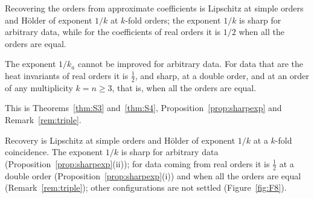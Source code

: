 %

Recovering the orders from approximate coefficients is Lipschitz at simple orders and H\"older of
exponent $1/k$ at $k$-fold orders; the exponent $1/k$ is sharp for arbitrary data, while for the
coefficients of real orders it is $1/2$ when all the orders are equal.

The exponent $1/k_a$ cannot be improved for arbitrary data. For data that are the heat invariants
of real orders it is $\frac12$, and sharp, at a double order, and at an order of any multiplicity
$k=n\ge3$, that is, when all the orders are equal.

This is Theorems~\ref{thm:S3} and~\ref{thm:S4}, Proposition~\ref{prop:sharpexp} and
Remark~\ref{rem:triple}.

Recovery is Lipschitz at simple orders and H\"older of exponent $1/k$ at a $k$-fold coincidence.
The exponent $1/k$ is sharp for arbitrary data (Proposition~\ref{prop:sharpexp}(ii)); for data
coming from real orders it is $\frac12$ at a double order (Proposition~\ref{prop:sharpexp}(i)) and when all
the orders are equal (Remark~\ref{rem:triple}); other configurations are not settled
(Figure~\ref{fig:F8}).

